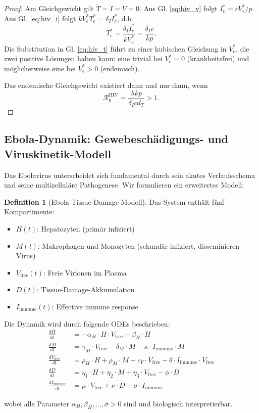 ﻿\documentclass[a4paper,12pt]{article}
\theoremstyle{definition}
\newtheorem{definition}{Definition}
\begin{document}
\begin{proof}
Am Gleichgewicht gilt $\dot{T} = \dot{I} = \dot{V} = 0$. Aus Gl. \eqref{eq:hiv_v} folgt $I_e^* = c V_e^* / p$. Aus Gl. \eqref{eq:hiv_i} folgt $k V_e^* T_e^* = \delta_I I_e^*$, d.h.
\[
T_e^* = \frac{\delta_I I_e^*}{k V_e^*} = \frac{\delta_I c}{k p}.
\]
Die Substitution in Gl. \eqref{eq:hiv_t} führt zu einer kubischen Gleichung in $V_e^*$, die zwei positive Lösungen haben kann: eine trivial bei $V_e^* = 0$ (krankheitsfrei) und möglicherweise eine bei $V_e^* > 0$ (endemisch).

Das endemische Gleichgewicht existiert dann und nur dann, wenn
\[
\mathcal{R}_0^{\text{HIV}} = \frac{\lambda k p}{\delta_I c d_T} > 1.
\]
\end{proof}

\subsection{Ebola-Dynamik: Gewebeschädigungs- und Viruskinetik-Modell}

Das Ebolavirus unterscheidet sich fundamental durch sein akutes Verlaufsschema und seine multizelluläre Pathogenese. Wir formulieren ein erweitertes Modell:

\begin{definition}[Ebola Tissue-Damage-Modell]
Das System enthält fünf Kompartimente:
\begin{itemize}
\item $H(t)$: Hepatozyten (primär infiziert)
\item $M(t)$: Makrophagen und Monozyten (sekundär infiziert, disseminieren Virus)
\item $V_{\text{free}}(t)$: Freie Virionen im Plasma
\item $D(t)$: Tissue-Damage-Akkumulation
\item $I_{\text{immune}}(t)$: Effective immune response
\end{itemize}

Die Dynamik wird durch folgende ODEs beschrieben:
\begin{align}
\frac{dH}{dt} &= -\alpha_H \cdot H \cdot V_{\text{free}} - \beta_H \cdot H \label{eq:ebola_h}\\
\frac{dM}{dt} &= \gamma_M \cdot V_{\text{free}} - \delta_M \cdot M - \kappa \cdot I_{\text{immune}} \cdot M \label{eq:ebola_m}\\
\frac{dV_{\text{free}}}{dt} &= \rho_H \cdot H + \rho_M \cdot M - c_V \cdot V_{\text{free}} - \theta \cdot I_{\text{immune}} \cdot V_{\text{free}} \label{eq:ebola_v}\\
\frac{dD}{dt} &= \eta_1 \cdot H + \eta_2 \cdot M + \eta_3 \cdot V_{\text{free}} - \phi \cdot D \label{eq:ebola_d}\\
\frac{dI_{\text{immune}}}{dt} &= \mu \cdot V_{\text{free}} + \nu \cdot D - \sigma \cdot I_{\text{immune}} \label{eq:ebola_immune}
\end{align}

wobei alle Parameter $\alpha_H, \beta_H, \ldots, \sigma > 0$ sind und biologisch interpretierbar.
\end{definition}
\end{document}
